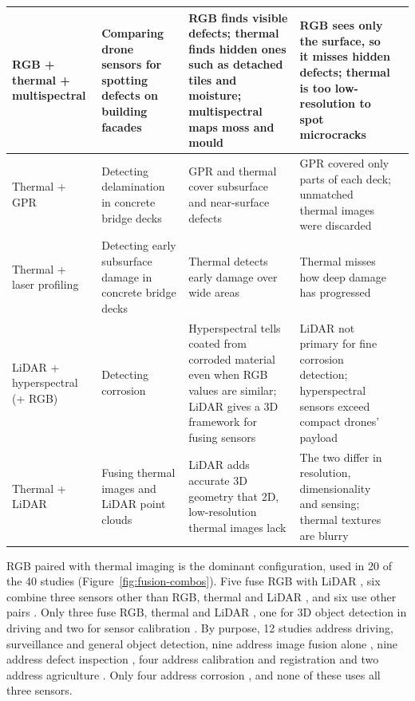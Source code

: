 {\begin{xltabular}{\textwidth}{>{\RaggedRight\arraybackslash}p{2.1cm}>{\RaggedRight\arraybackslash}p{2.9cm}>{\RaggedRight\arraybackslash}X>{\RaggedRight\arraybackslash}Xp{0.95cm}}
\midrule
RGB + thermal + multispectral & Comparing drone sensors for spotting defects on building facades & RGB finds visible defects; thermal finds hidden ones such as detached tiles and moisture; multispectral maps moss and mould & RGB sees only the surface, so it misses hidden defects; thermal is too low-resolution to spot microcracks & \citep{Guedes2025} \\
\midrule
Thermal + GPR & Detecting delamination in concrete bridge decks & GPR and thermal cover subsurface and near-surface defects & GPR covered only parts of each deck; unmatched thermal images were discarded & \citep{Rashidi2026} \\
\midrule
Thermal + laser profiling & Detecting early subsurface damage in concrete bridge decks & Thermal detects early damage over wide areas & Thermal misses how deep damage has progressed & \citep{Yamashita2025} \\
\midrule
LiDAR + hyperspectral (+ RGB) & Detecting corrosion & Hyperspectral tells coated from corroded material even when RGB values are similar; LiDAR gives a 3D framework for fusing sensors & LiDAR not primary for fine corrosion detection; hyperspectral sensors exceed compact drones' payload & \citep{PallasEnguita2025} \\
\midrule
Thermal + LiDAR & Fusing thermal images and LiDAR point clouds & LiDAR adds accurate 3D geometry that 2D, low-resolution thermal images lack & The two differ in resolution, dimensionality and sensing; thermal textures are blurry & \citep{Zhu2026a} \\
\end{xltabular}
}


RGB paired with thermal imaging is the dominant configuration, used in 20 of the
40 studies (Figure~\ref{fig:fusion-combos}). Five fuse RGB with LiDAR \citep{Cheng2025,Zhang2026d,Maru2025,PimenteldeFigueiredo2025,Tang2025}, six combine three
sensors other than RGB, thermal and LiDAR \citep{Wu2025,Cao2026,Nooralishahi2022,Laidouni2025,Guedes2025,PallasEnguita2025}, and
six use other pairs \citep{Byeon2026,Asad2026,Gunatilake2021,Rashidi2026,Yamashita2025,Zhu2026a}. Only three fuse RGB,
thermal and LiDAR \citep{Tran2025,Tran2024,Yang2024}, one for 3D object detection in driving \citep{Tran2025}
and two for sensor calibration \citep{Tran2024,Yang2024}. By purpose, 12 studies address
driving, surveillance and general object detection, nine address image fusion
alone \citep{Gao2026,Lin2026,Zhu2026,Xiao2026,Xu2026,Chen2026a,An2026,Zhou2026,Laidouni2025}, nine address defect inspection
\citep{Asad2026,Gunatilake2021,Shahsavarani2024,Yang2023,Li2024c,Rashidi2026,Yamashita2025,Nooralishahi2022,Guedes2025}, four address calibration and
registration \citep{Bin2023,Yang2024,Tran2024,Zhu2026a} and two address agriculture \citep{Tang2025,Cao2026}. Only
four address corrosion \citep{Lim2021,Maru2025,PimenteldeFigueiredo2025,PallasEnguita2025}, and none of these uses all three
sensors.



